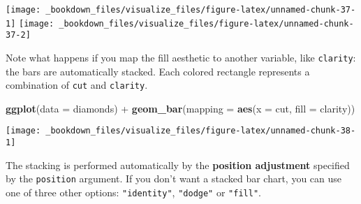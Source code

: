 \documentclass[]{book}
\newenvironment{Shaded}{\begin{snugshade}}{\end{snugshade}}
\newcommand{\KeywordTok}[1]{\textcolor[rgb]{0.13,0.29,0.53}{\textbf{{#1}}}}
\newcommand{\DataTypeTok}[1]{\textcolor[rgb]{0.13,0.29,0.53}{{#1}}}
\newcommand{\StringTok}[1]{\textcolor[rgb]{0.31,0.60,0.02}{{#1}}}
\newcommand{\NormalTok}[1]{{#1}}
\begin{document}
\texttt{[image: \_bookdown\_files/visualize\_files/figure-latex/unnamed-chunk-37-1]}
\texttt{[image: \_bookdown\_files/visualize\_files/figure-latex/unnamed-chunk-37-2]}

Note what happens if you map the fill aesthetic to another variable,
like \texttt{clarity}: the bars are automatically stacked. Each colored
rectangle represents a combination of \texttt{cut} and \texttt{clarity}.

\begin{Shaded}
\begin{Highlighting}[]
\KeywordTok{ggplot}\NormalTok{(}\DataTypeTok{data =} \NormalTok{diamonds) +}\StringTok{ }
\StringTok{  }\KeywordTok{geom_bar}\NormalTok{(}\DataTypeTok{mapping =} \KeywordTok{aes}\NormalTok{(}\DataTypeTok{x =} \NormalTok{cut, }\DataTypeTok{fill =} \NormalTok{clarity))}
\end{Highlighting}
\end{Shaded}

\begin{center}\texttt{[image: \_bookdown\_files/visualize\_files/figure-latex/unnamed-chunk-38-1]} \end{center}

The stacking is performed automatically by the \textbf{position
adjustment} specified by the \texttt{position} argument. If you don't
want a stacked bar chart, you can use one of three other options:
\texttt{"identity"}, \texttt{"dodge"} or \texttt{"fill"}.
\end{document}

